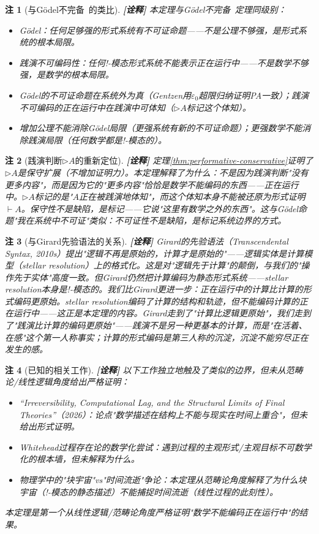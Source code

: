 \documentclass[11pt,a4paper]{article}
\newtheorem{remark}{注}
\newcommand{\lvl}[1]{\hfill\textbf{\footnotesize[#1]}}
\newcommand{\lvI}{\lvl{诠释}}
\begin{document}
\begin{remark}[与G\"odel不完备~\cite{godel31}的类比]\lvI
本定理与G\"odel不完备~\cite{godel31}定理同级别：
\begin{itemize}
  \item G\"odel：任何足够强的形式系统有不可证命题——不是公理不够强，是形式系统的根本局限。
  \item 践演不可编码性：任何!-模态形式系统不能表示正在运行中——不是数学不够强，是数学的根本局限。
  \item G\"odel的不可证命题在系统外为真（Gentzen用$\varepsilon_0$超限归纳证明PA一致）；践演不可编码的正在运行中在践演中可体知（$\triangleright A$标记这个体知）。
  \item 增加公理不能消除G\"odel局限（更强系统有新的不可证命题）；更强数学不能消除践演局限（任何数学都是!-模态的）。
\end{itemize}
\end{remark}

\begin{remark}[践演判断$\triangleright A$的重新定位]\lvI
定理\ref{thm:performative-conservative}证明了$\triangleright A$是保守扩展（不增加证明力）。本定理解释了\emph{为什么}：不是因为践演判断"没有更多内容"，而是因为它的"更多内容"恰恰是数学不能编码的东西——正在运行中。$\triangleright A$标记的是"$A$正在被践演地体知"，而这个体知本身不能被还原为形式证明$\vdash A$。保守性不是缺陷，是\emph{标记}——它说"这里有数学之外的东西"。这与G\"odel命题"我在系统中不可证"类似：不可证性不是缺陷，是标记系统边界的方式。
\end{remark}

\begin{remark}[与Girard先验语法的关系]\lvI
Girard的先验语法（Transcendental Syntax, 2010s）提出"逻辑不再是原始的，计算才是原始的"——逻辑实体是计算模型（stellar resolution）上的格式化。这是对"逻辑先于计算"的颠倒，与我们的"操作先于实体"高度一致。但Girard仍然把计算编码为静态形式系统——stellar resolution本身是!-模态的。我们比Girard更进一步：\emph{正在运行中的计算比计算的形式编码更原始}。stellar resolution编码了计算的结构和轨迹，但不能编码计算的正在运行中——这正是本定理的内容。Girard走到了"计算比逻辑更原始"，我们走到了"践演比计算的编码更原始"——践演不是另一种更基本的计算，而是"在活着、在感"这个第一人称事实；计算的形式编码是第三人称的沉淀，沉淀不能穷尽正在发生的感。
\end{remark}

\begin{remark}[已知的相关工作]\lvI
以下工作独立地触及了类似的边界，但未从范畴论/线性逻辑角度给出严格证明：
\begin{itemize}
  \item ``Irreversibility, Computational Lag, and the Structural Limits of Final Theories''（2026）：论点"数学描述在结构上不能与现实在时间上重合"，但未给出形式证明。
  \item Whitehead过程存在论的数学化尝试：遇到过程的主观形式/主观目标不可数学化的根本墙，但未解释为什么。
  \item 物理学中的"块宇宙"vs"时间流逝"争论：本定理从范畴论角度解释了为什么块宇宙（!-模态的静态描述）不能捕捉时间流逝（线性过程的此刻性）。
\end{itemize}
本定理是第一个从线性逻辑/范畴论角度严格证明"数学不能编码正在运行中"的结果。
\end{remark}
\end{document}
